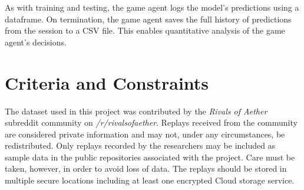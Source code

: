 As with training and testing, the game agent logs the model's predictions using a dataframe. On termination, the game agent saves the full history of predictions from the session to a CSV file. This enables quantitative analysis of the game agent's decisions.




\section{Criteria and Constraints}

The dataset used in this project was contributed by the \textit{Rivals of Aether} subreddit community on \textit{/r/rivalsofaether}. Replays received from the community are considered private information and may not, under any circumstances, be redistributed. Only replays recorded by the researchers may be included as sample data in the public repositories associated with the project. Care must be taken, however, in order to avoid loss of data. The replays should be stored in multiple secure locations including at least one encrypted Cloud storage service.

